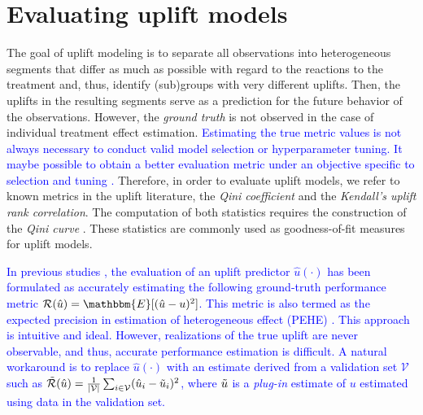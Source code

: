 \documentclass{article}
\begin{document}
\section{Evaluating uplift models}


The goal of uplift modeling is to separate all observations into heterogeneous segments that differ as much as possible with regard to the reactions to the treatment and, thus, identify (sub)groups with very different uplifts. Then, the uplifts in the resulting segments serve as a prediction for the future behavior of the observations. However, the \textit{ground truth} is not observed in the case of individual treatment effect estimation. \textcolor{blue}{Estimating the true metric values is not always necessary to conduct valid model selection or hyperparameter tuning. It maybe possible to obtain a better evaluation metric under an objective specific to selection and tuning \citep{saito2019counterfactual}.} Therefore, in order to evaluate uplift models, we refer to known metrics in the uplift literature, the {\it Qini coefficient} and the {\it Kendall's uplift rank correlation}. The computation of both statistics requires the construction of the {\it Qini curve} \citep{radcliffe2007using}. These statistics are commonly used as goodness-of-fit measures for uplift models.


\textcolor{blue}{In previous studies \citep{gutierrez2017causal, schuler2018comparison, alaa2019validating}, the evaluation of an uplift predictor $\hat{u}(\cdot)$ has been formulated as accurately estimating the following ground-truth performance metric $\mathcal{R}(\hat{u}) = \mathbbm{E}[( \hat u - u )^2]$. This metric is also termed as the expected precision in estimation of heterogeneous effect (PEHE) \citep{hill2011bayesian}. This approach is intuitive and ideal. However, realizations of the true uplift are never observable, and thus, accurate performance estimation is difficult. A natural workaround is to replace $\hat{u}(\cdot)$ with an estimate derived from a validation set $\mathcal{V}$ such as $\mathcal{\Tilde{R}}(\hat{u}) = \frac{1}{|\mathcal{V}|}\sum_{i \in \mathcal{V}}( \hat{u}_i - \Tilde{u}_i )^2$, where $\Tilde{u}$ is a {\it plug-in} estimate of $u$ estimated using data in the validation set.}
\end{document}
